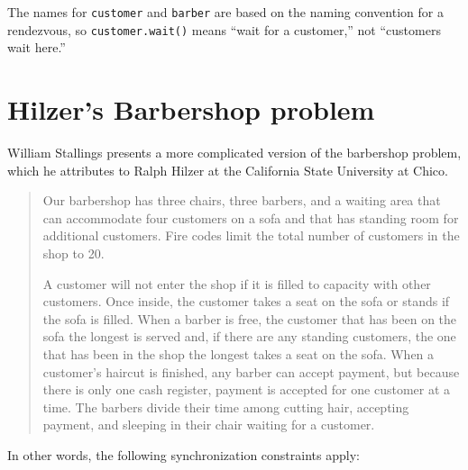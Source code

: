 \documentclass{book}
\newcommand{\clearemptydoublepage}{\newpage\cleardoublepage}
\begin{document}
The names for {\tt customer} and {\tt barber} are based on
the naming convention for a rendezvous, so {\tt customer.wait()}
means ``wait for a customer,'' not ``customers wait here.''


\clearemptydoublepage
\section {Hilzer's Barbershop problem}

William Stallings \cite{stallings} presents a more complicated version
of the barbershop problem, which he attributes to Ralph Hilzer at the
California State University at Chico.

\begin{quotation}
Our barbershop has three chairs, three barbers, and a waiting
area that can accommodate four customers on a sofa and that has
standing room for additional customers.  Fire codes limit the
total number of customers in the shop to 20.

A customer will not enter the shop if it is filled to capacity with
other customers.  Once inside, the customer takes a seat on the sofa
or stands if the sofa is filled.  When a barber is free, the customer
that has been on the sofa the longest is served and, if there are any
standing customers, the one that has been in the shop the longest
takes a seat on the sofa.  When a customer's haircut is finished, any
barber can accept payment, but because there is only one cash
register, payment is accepted for one customer at a time.  The barbers
divide their time among cutting hair, accepting payment, and sleeping
in their chair waiting for a customer.
\end{quotation}


In other words, the
following synchronization constraints apply:
\end{document}
